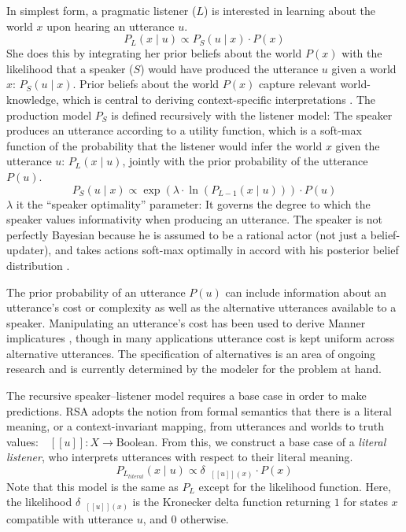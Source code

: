 \documentclass[12pt,letterpaper]{article}
\newcommand{\denote}[1]{\mbox{ $[\![ #1 ]\!]$}}
\begin{document}
In simplest form, a pragmatic listener ($L$) is interested in learning about the world $x$ upon hearing an utterance $u$. 
$$
P_{L}(x  \mid u) \propto P_{S}(u \mid x) \cdot P(x) \label{eq:RSA_L}
$$
She does this by integrating her prior beliefs about the world $P(x)$ with the likelihood that a speaker ($S$) would have produced the utterance $u$ given a world $x$: $P_{S}(u \mid x)$.
Prior beliefs about the world $P(x)$ capture relevant world-knowledge, which is central to deriving context-specific interpretations \cite{Degen2015cogsci}.
The production model $P_{S}$ is defined recursively with the listener model: The speaker produces an utterance according to a utility function, which is a soft-max function of the probability that the listener would infer the world $x$ given the utterance $u$: $P_{L}(x  \mid u)$, jointly with the prior probability of the utterance $P(u)$.
$$
P_{S}(u \mid x) \propto \exp{(\lambda \cdot \ln (P_{L-1}(x  \mid u) ) )} \cdot P(u) \label{eq:RSA_S}
$$
$\lambda$ it the ``speaker optimality'' parameter: It governs the degree to which the speaker values informativity when producing an utterance. The speaker is not perfectly Bayesian because he is assumed to be a rational actor (not just a belief-updater), and takes actions soft-max optimally in accord with his posterior belief distribution \cite{Baker2009}.

The prior probability of an utterance $P(u)$ can include information about an utterance's cost or complexity as well as the alternative utterances available to a speaker. 
Manipulating an utterance's cost has been used to derive Manner implicatures \cite{Bergen2016}, though in many applications utterance cost is kept uniform across alternative utterances. 
The specification of alternatives is an area of ongoing research \cite{Franke2014cogsci, Peloquin2016} and is currently determined by the modeler for the problem at hand.

The recursive speaker--listener model requires a base case in order to make predictions. 
RSA adopts the notion from formal semantics that there is a literal meaning, or a context-invariant mapping, from utterances and worlds to truth values:  $\denote{u}: X \rightarrow \text{Boolean}$. 
From this, we construct a base case of a \emph{literal listener}, who interprets utterances with respect to their literal meaning.
%
$$
P_{L_{literal}}(x \mid u ) \propto {\delta_{\denote{u}(x)} \cdot P(x)} \label{eq:RSA_L0}
$$
Note that this model is the same as $P_L$ except for the likelihood function. 
%
Here, the likelihood $\delta_{\denote{u}(x)}$ is the Kronecker delta function returning $1$ for states $x$ compatible with utterance $u$, and $0$ otherwise.
\end{document}
